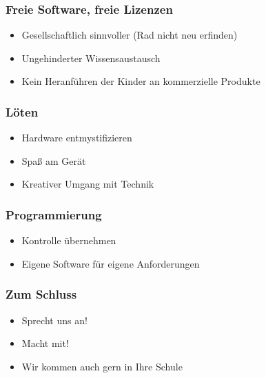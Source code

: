 \documentclass[12pt]{beamer}
\begin{document}
\begin{frame}
  \frametitle{Freie Software, freie Lizenzen}
  \begin{itemize}
    \item Gesellschaftlich sinnvoller (Rad nicht neu erfinden)
    \item Ungehinderter Wissensaustausch
    \item Kein Heranführen der Kinder an kommerzielle Produkte
  \end{itemize}
\end{frame}

\begin{frame}
  \frametitle{Löten}
  \begin{itemize}
    \item Hardware entmystifizieren
    \item Spaß am Gerät
    \item Kreativer Umgang mit Technik
  \end{itemize}
\end{frame}

\begin{frame}
  \frametitle{Programmierung}
  \begin{itemize}
    \item Kontrolle übernehmen
    \item Eigene Software für eigene Anforderungen
  \end{itemize}
\end{frame}

\begin{frame}
  \frametitle{Zum Schluss}
  \begin{itemize}
    \item Sprecht uns an!
    \item Macht mit!
    \item Wir kommen auch gern in Ihre Schule
  \end{itemize}
\end{frame}
\end{document}
